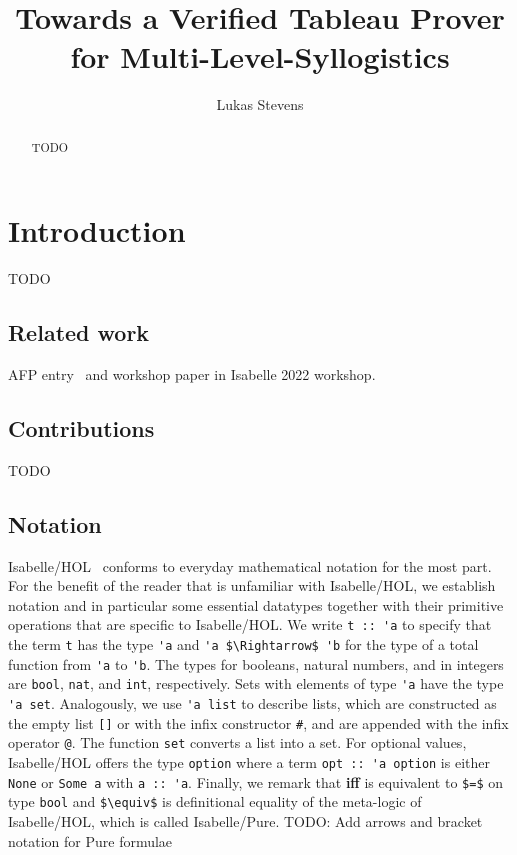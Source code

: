 \documentclass[sigplan,10pt,anonymous,review]{acmart}
\begin{document}
\setcounter{tocdepth}{1}

\title{Towards a Verified Tableau Prover for Multi-Level-Syllogistics}
\author{Lukas Stevens}

\begin{abstract}
  TODO
\end{abstract}

\maketitle

\section{Introduction}
TODO

\subsection{Related work}
AFP entry~\cite{hybrid_logic_afp} and workshop paper in Isabelle 2022 workshop.

\subsection{Contributions}
TODO

\subsection{Notation}
Isabelle/HOL~\cite{isabelle} conforms to everyday mathematical notation for the most part.
For the benefit of the reader that is unfamiliar with Isabelle/HOL, we establish notation and in particular some essential datatypes together with their primitive operations that are specific to Isabelle/HOL.
We write \lstinline!t :: 'a! to specify that the term \lstinline!t! has the type \lstinline!'a! and \lstinline!'a $\Rightarrow$ 'b! for the type of a total function from \lstinline!'a! to \lstinline!'b!.
The types for booleans, natural numbers, and in integers are \lstinline!bool!, \lstinline!nat!, and \lstinline!int!, respectively.
Sets with elements of type \lstinline!'a! have the type \lstinline!'a set!.
Analogously, we use \lstinline!'a list! to describe lists, which are constructed as the empty list \lstinline![]! or with the infix constructor \lstinline!#!, and are appended with the infix operator \lstinline!@!.
The function \lstinline!set! converts a list into a set.
For optional values, Isabelle/HOL offers the type \lstinline!option! where a term \lstinline!opt :: 'a option! is either \lstinline!None! or \lstinline!Some a! with \lstinline!a :: 'a!.
Finally, we remark that \textbf{iff} is equivalent to \lstinline!$=$! on type \lstinline!bool! and \lstinline!$\equiv$! is definitional equality of the meta-logic of Isabelle/HOL, which is called Isabelle/Pure.
TODO: Add arrows and bracket notation for Pure formulae
\end{document}
